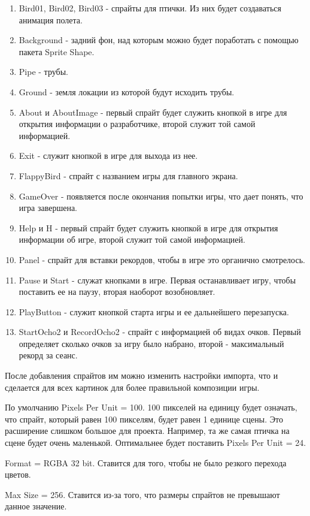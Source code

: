 \documentclass[14pt, oneside]{altsu-report}
\begin{document}
\begin{enumerate}
\item Bird01, Bird02, Bird03 - спрайты для птички. Из них будет создаваться анимация полета.
\item Background - задний фон, над которым можно будет поработать с помощью пакета Sprite Shape.
\item Pipe - трубы.
\item Ground - земля локации из которой будут исходить трубы.
\item About и AboutImage - первый спрайт будет служить кнопкой в игре для открытия информации о разработчике, второй служит той самой информацией.
\item Exit - служит кнопкой в игре для выхода из нее.
\item FlappyBird - спрайт с названием игры для главного экрана.
\item GameOver - появляется после окончания попытки игры, что дает понять, что игра завершена.
\item Help и H - первый спрайт будет служить кнопкой в игре для открытия информации об игре, второй служит той самой информацией.
\item Panel - спрайт для вставки рекордов, чтобы в игре это органично смотрелось.
\item Pause и Start - служат кнопками в игре. Первая останавливает игру, чтобы поставить ее на паузу, вторая наоборот возобновляет.
\item PlayButton - служит кнопкой старта игры и ее дальнейшего перезапуска.
\item StartOcho2 и RecordOcho2 - спрайт с информацией об видах очков. Первый определяет сколько очков за игру было набрано, второй - максимальный рекорд за сеанс.
\end{enumerate} 

После добавления спрайтов им можно изменить настройки импорта, что и сделается для всех картинок для более правильной композиции игры.

По умолчанию Pixels Per Unit = 100. 100 пикселей на единицу будет означать, что спрайт, который равен 100 пикселям, будет равен 1 единице сцены. Это расширение слишком большое для проекта. Например, та же самая птичка на сцене будет очень маленькой. Оптимальнее будет поставить Pixels Per Unit = 24.

Format = RGBA 32 bit. Ставится для того, чтобы не было резкого перехода цветов.

Max Size = 256. Ставится из-за того, что размеры спрайтов не превышают данное значение.
\end{document}
